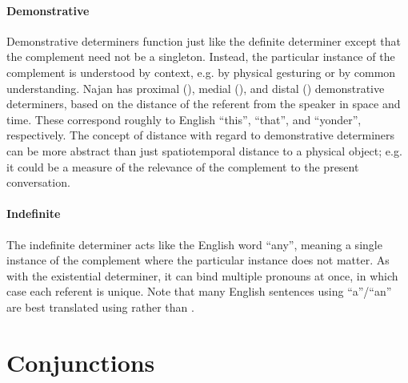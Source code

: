 \paragraph{Demonstrative} Demonstrative determiners function just like the
definite determiner except that the complement need not be a singleton. Instead,
the particular instance of the complement is understood by context, e.g. by
physical gesturing or by common understanding. Najan has proximal
(), medial (), and distal () demonstrative
determiners, based on the distance of the referent from the speaker in space and
time. These correspond roughly to English ``this'', ``that'', and ``yonder'',
respectively. The concept of distance with regard to demonstrative determiners
can be more abstract than just spatiotemporal distance to a physical object;
e.g. it could be a measure of the relevance of the complement to the present
conversation.

\paragraph{Indefinite} The indefinite determiner  acts like the
English word ``any'', meaning a single instance of the complement where the
particular instance does not matter. As with the existential determiner, it can
bind multiple pronouns at once, in which case each referent is unique. Note that
many English sentences using ``a''/``an'' are best translated using 
rather than .




\section{Conjunctions} \label{sec:conjunctions}

